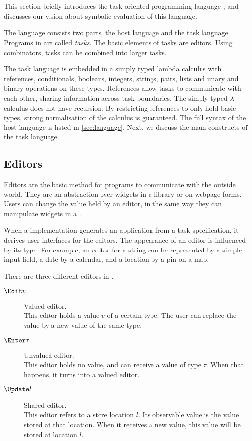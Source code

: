 
\section{\TOPHAT}
\label{sec:intuition}

This section briefly introduces the task-oriented programming language \TOPHAT,
and discusses our vision about symbolic evaluation of this language.

The \TOPHAT language consists two parts, the host language and the task language.
Programs in \TOPHAT are called \emph{tasks}.
The basic elements of tasks are editors.
Using combinators, tasks can be combined into larger tasks.

The task language is embedded in a simply typed lambda calculus with references, conditionals, booleans, integers, strings, pairs, lists and unary and binary operations on these types.
References allow tasks to communicate with each other, sharing information across task boundaries.
The simply typed $\lambda$-calculus does not have recursion.
By restricting references to only hold basic types,
strong normalisation of the calculus is guaranteed.
The full syntax of the host language is listed in \cref{sec:language}.
Next, we discuss the main constructs of the task language.


\subsection{Editors}

Editors are the basic method for programs to communicate with the outside world.
They are an abstraction over widgets in a \GUI library or on webpage forms.
Users can change the value held by an editor, in the same way they can manipulate widgets in a \GUI.

When a \TOP implementation generates an application from a task specification, it derives user interfaces for the editors.
The appearance of an editor is influenced by its type.
For example, an editor for a string can be represented by a simple input field, a date by a calendar, and a location by a pin on a map.

There are three different editors in \TOPHAT.
\begin{description}
  \item[$\Edit v$] Valued editor.\\
    This editor holds a value $v$ of a certain type.
    The user can replace the value by a new value of the same type.
  \item[$\Enter \tau$] Unvalued editor.\\
    This editor holds no value, and can receive a value of type $\tau$.
    When that happens, it turns into a valued editor.
  \item[$\Update l$] Shared editor.\\
    This editor refers to a store location $l$.
    Its observable value is the value stored at that location.
    When it receives a new value, this value will be stored at location $l$.
\end{description}



